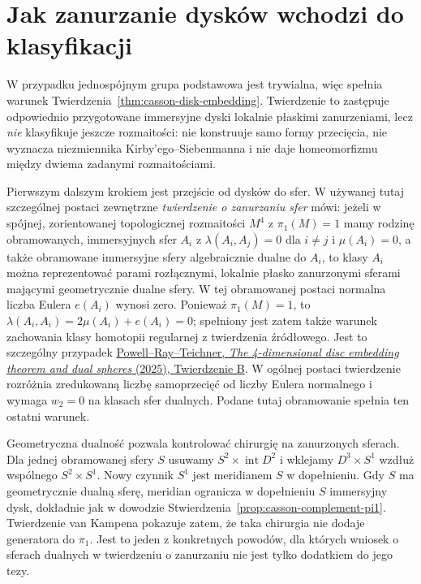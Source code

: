 \section{Jak zanurzanie dysków wchodzi do klasyfikacji}
\label{sec:freedman-route}

W przypadku jednospójnym grupa podstawowa jest
trywialna, więc spełnia warunek
Twierdzenia~\ref{thm:casson-disk-embedding}.
Twierdzenie to zastępuje odpowiednio przygotowane
immersyjne dyski lokalnie płaskimi zanurzeniami, lecz
\emph{nie} klasyfikuje jeszcze rozmaitości: nie
konstruuje samo formy przecięcia, nie wyznacza
niezmiennika Kirby'ego--Siebenmanna i nie daje
homeomorfizmu między dwiema zadanymi rozmaitościami.

Pierwszym dalszym krokiem jest przejście od dysków
do sfer. W używanej tutaj szczególnej postaci
zewnętrzne \emph{twierdzenie o zanurzaniu sfer} mówi:
jeżeli w spójnej, zorientowanej topologicznej
rozmaitości $M^4$ z $\pi_1(M)=1$ mamy rodzinę obramowanych,
immersyjnych sfer $A_i$ z
$\lambda(A_i,A_j)=0$ dla $i\ne j$ i
$\mu(A_i)=0$, a także obramowane immersyjne sfery
algebraicznie dualne do $A_i$, to klasy $A_i$ można
reprezentować parami rozłącznymi, lokalnie płasko
zanurzonymi sferami mającymi geometrycznie dualne
sfery. W tej obramowanej postaci normalna liczba Eulera
$e(A_i)$ wynosi zero. Ponieważ $\pi_1(M)=1$,
to $\lambda(A_i,A_i)=2\mu(A_i)+e(A_i)=0$;
spełniony jest zatem także warunek zachowania klasy
homotopii regularnej z twierdzenia źródłowego.
Jest to szczególny
przypadek \href{https://doi.org/10.1007/s00029-025-01069-y}
{Powell--Ray--Teichner, \emph{The 4-dimensional disc
embedding theorem and dual spheres} (2025),
Twierdzenie B}. W ogólnej postaci twierdzenie
rozróżnia zredukowaną liczbę samoprzecięć od
liczby Eulera normalnego i wymaga $w_2=0$ na
klasach sfer dualnych. Podane tutaj obramowanie
spełnia ten ostatni warunek.

Geometryczna dualność pozwala kontrolować
chirurgię na zanurzonych sferach. Dla jednej
obramowanej sfery $S$ usuwamy
$S^2\times\operatorname{int}D^2$ i wklejamy
$D^3\times S^1$ wzdłuż wspólnego
$S^2\times S^1$. Nowy czynnik $S^1$ jest
meridianem $S$ w dopełnieniu. Gdy $S$ ma
geometrycznie dualną sferę, meridian ogranicza
w dopełnieniu $S$ immersyjny dysk, dokładnie jak
w dowodzie Stwierdzenia~\ref{prop:casson-complement-pi1}.
Twierdzenie van Kampena pokazuje zatem, że taka
chirurgia nie dodaje generatora do $\pi_1$.
Jest to jeden z konkretnych powodów, dla których
wniosek o sferach dualnych w twierdzeniu o
zanurzaniu nie jest tylko dodatkiem do jego tezy.

